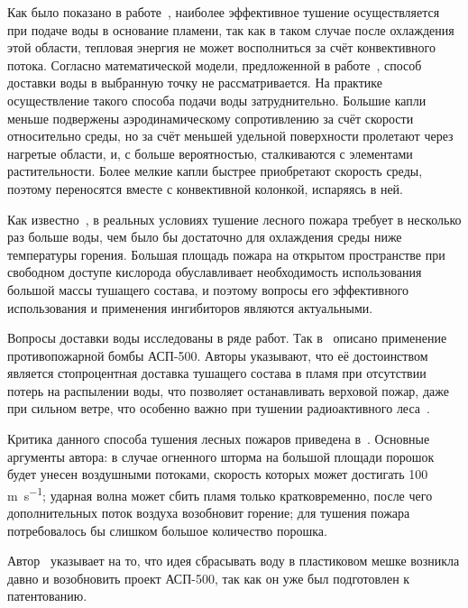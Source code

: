 Как было показано в работе~\cite{on_the_laws_of_combustion_wave_supp}, наиболее эффективное тушение осуществляется
при подаче воды в основание пламени, так как в таком случае после охлаждения этой области, тепловая энергия не
может восполниться за счёт конвективного потока.
Согласно математической модели, предложенной в работе~\cite{on_the_laws_of_combustion_wave_supp}, способ доставки
воды в выбранную точку не рассматривается.
На практике осуществление такого способа подачи воды затруднительно.
Большие капли меньше подвержены аэродинамическому сопротивлению за счёт скорости относительно среды, но
за счёт меньшей удельной поверхности пролетают через нагретые области, и, с больше вероятностью, сталкиваются с
элементами растительности.
Более мелкие капли быстрее приобретают скорость среды, поэтому переносятся вместе с конвективной колонкой,
испаряясь в ней.

Как известно~\cite{abduragimov_physics_and_chem_wrt_fire}, в реальных условиях тушение лесного пожара
требует в несколько раз больше воды, чем было бы достаточно для охлаждения среды ниже температуры горения.
Большая площадь пожара на открытом пространстве при свободном доступе кислорода обуславливает необходимость
использования большой массы тушащего состава, и поэтому вопросы его эффективного использования и применения
ингибиторов являются актуальными.

Вопросы доставки воды исследованы в ряде работ.
Так в~\cite{tarasov_fire_extinguishing_technologies} описано применение противопожарной бомбы АСП-500.
Авторы указывают, что её достоинством является стопроцентная доставка тушащего состава в пламя при
отсутствии потерь на распылении воды, что позволяет останавливать верховой пожар, даже при сильном ветре,
что особенно важно при тушении радиоактивного леса~\cite{zachmatov_radioactive_fire}.

Критика данного способа тушения лесных пожаров приведена в~\cite{abduragimov_fire_not_be_bombed}.
Основные аргументы автора: в случае огненного шторма на большой площади порошок будет унесен воздушными
потоками, скорость которых может достигать 100 \si{\metre\per\second};
ударная волна может сбить пламя только кратковременно, после чего дополнительных поток воздуха возобновит горение;
для тушения пожара потребовалось бы слишком большое количество порошка.

Автор~\cite{mirimovich_revive_asp_500} указывает на то, что идея сбрасывать воду в пластиковом мешке возникла давно и
возобновить проект АСП-500, так как он уже был подготовлен к патентованию.

